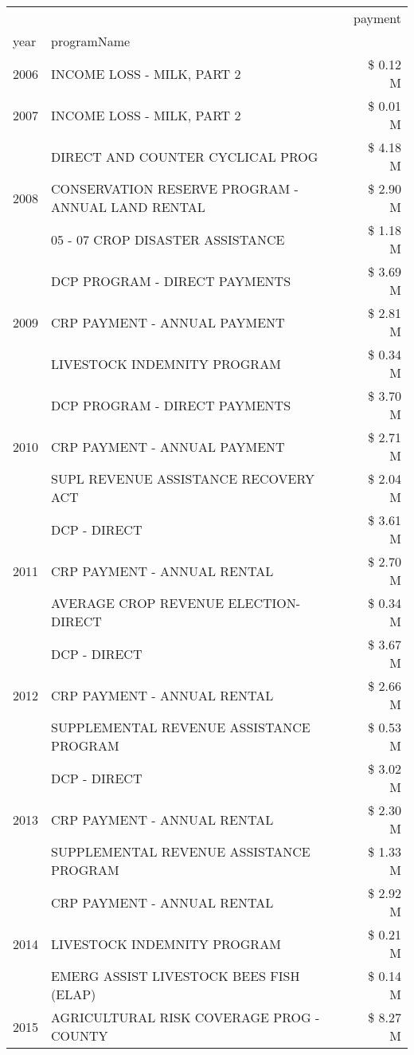 \begin{tabular}{llr}
\toprule
 &  & payment \\
year & programName &  \\
\midrule
2006 & INCOME LOSS - MILK, PART 2 & \$ 0.12 M \\
\cline{1-3}
2007 & INCOME LOSS - MILK, PART 2 & \$ 0.01 M \\
\cline{1-3}
\multirow[t]{3}{*}{2008} & DIRECT AND COUNTER CYCLICAL PROG & \$ 4.18 M \\
 & CONSERVATION RESERVE PROGRAM - ANNUAL LAND RENTAL & \$ 2.90 M \\
 & 05 - 07 CROP DISASTER ASSISTANCE & \$ 1.18 M \\
\cline{1-3}
\multirow[t]{3}{*}{2009} & DCP PROGRAM - DIRECT PAYMENTS & \$ 3.69 M \\
 & CRP PAYMENT - ANNUAL PAYMENT & \$ 2.81 M \\
 & LIVESTOCK INDEMNITY PROGRAM & \$ 0.34 M \\
\cline{1-3}
\multirow[t]{3}{*}{2010} & DCP PROGRAM - DIRECT PAYMENTS & \$ 3.70 M \\
 & CRP PAYMENT - ANNUAL PAYMENT & \$ 2.71 M \\
 & SUPL REVENUE ASSISTANCE RECOVERY ACT & \$ 2.04 M \\
\cline{1-3}
\multirow[t]{3}{*}{2011} & DCP - DIRECT & \$ 3.61 M \\
 & CRP PAYMENT - ANNUAL RENTAL & \$ 2.70 M \\
 & AVERAGE CROP REVENUE ELECTION-DIRECT & \$ 0.34 M \\
\cline{1-3}
\multirow[t]{3}{*}{2012} & DCP - DIRECT & \$ 3.67 M \\
 & CRP PAYMENT - ANNUAL RENTAL & \$ 2.66 M \\
 & SUPPLEMENTAL REVENUE ASSISTANCE PROGRAM & \$ 0.53 M \\
\cline{1-3}
\multirow[t]{3}{*}{2013} & DCP - DIRECT & \$ 3.02 M \\
 & CRP PAYMENT - ANNUAL RENTAL & \$ 2.30 M \\
 & SUPPLEMENTAL REVENUE ASSISTANCE PROGRAM & \$ 1.33 M \\
\cline{1-3}
\multirow[t]{3}{*}{2014} & CRP PAYMENT - ANNUAL RENTAL & \$ 2.92 M \\
 & LIVESTOCK INDEMNITY PROGRAM & \$ 0.21 M \\
 & EMERG ASSIST LIVESTOCK BEES FISH (ELAP) & \$ 0.14 M \\
\cline{1-3}
\multirow[t]{3}{*}{2015} & AGRICULTURAL RISK COVERAGE PROG - COUNTY & \$ 8.27 M \\

\end{tabular}
